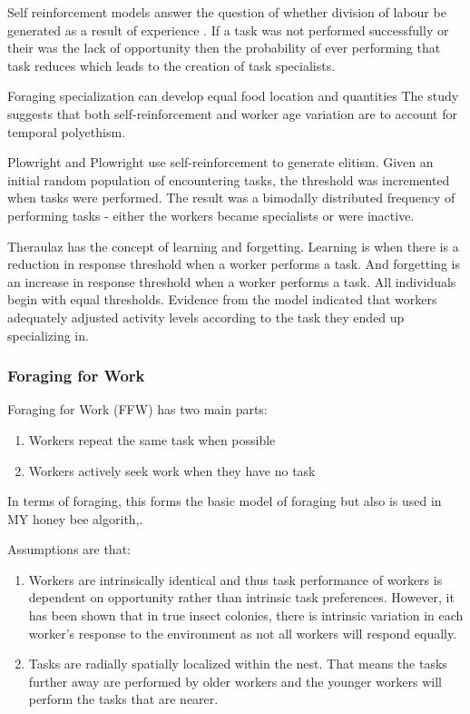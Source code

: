 Self reinforcement models answer the question of whether division of labour be generated as a result of experience \cite{lerman2005review}. If a task was not performed successfully or their was the lack of opportunity then the probability of ever performing that task reduces which leads to the creation of task specialists. 

Foraging specialization can develop equal food location and quantities \cite{deneubourg1987self} %
The study suggests that both self-reinforcement and worker age variation are to account for temporal polyethism. 

Plowright and Plowright \cite{plowright1988elitism} use self-reinforcement to generate elitism. Given an initial random population of encountering tasks, the threshold was incremented when tasks were performed. The result was a bimodally distributed frequency of performing tasks - either the workers became specialists or were inactive. 

Theraulaz \cite{theraulaz1998response} has the concept of learning and forgetting. Learning is when there is a reduction in response threshold when a worker performs a task. And forgetting is an increase in response threshold when a worker performs a task. All individuals begin with equal thresholds. Evidence from the model indicated that workers adequately adjusted activity levels according to the task they ended up specializing in. %

\subsubsection{Foraging for Work}
Foraging for Work (FFW) has two main parts:
\begin{enumerate}
	\item Workers repeat the same task when possible
	\item Workers actively seek work when they have no task
\end{enumerate}

In terms of foraging, this forms the basic model of foraging but also is used in MY honey bee algorith,. 

Assumptions are that:
\begin{enumerate}
	\item Workers are intrinsically identical and thus task performance of workers is dependent on opportunity rather than intrinsic task preferences.  However, it has been shown that in true insect colonies, there is intrinsic variation in each worker's response to the environment as not all workers will respond equally. 
	\item Tasks are radially spatially localized within the nest. That means the tasks further away are performed by older workers and the younger workers will perform the tasks that are nearer.
\end{enumerate}

